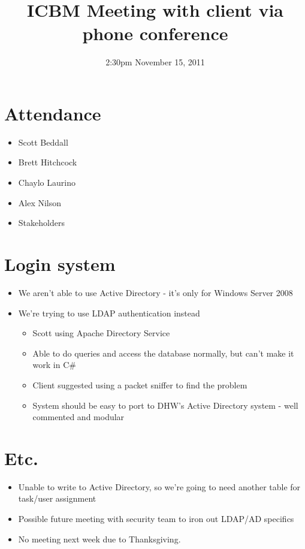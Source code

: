 \documentclass{article}
\begin{document}
\title{ICBM Meeting with client via phone conference}
\date{2:30pm November 15, 2011}
\maketitle

\section{Attendance}
\begin{itemize}
\item Scott Beddall
\item Brett Hitchcock
\item Chaylo Laurino
\item Alex Nilson
\item Stakeholders
\end{itemize}

\section{Login system}
\begin{itemize}
\item We aren't able to use Active Directory - it's only for Windows Server 2008
\item We're trying to use LDAP authentication instead
	\begin{itemize}
	\item Scott using Apache Directory Service
	\item Able to do queries and access the database normally, but can't make it work in C\#
	\item Client suggested using a packet sniffer to find the problem
	\item System should be easy to port to DHW's Active Directory system - well commented and modular
	\end{itemize}
\end{itemize}

\section{Etc.}
\begin{itemize}
\item Unable to write to Active Directory, so we're going to need another table for task/user assignment
\item Possible future meeting with security team to iron out LDAP/AD specifics
\item No meeting next week due to Thanksgiving.
\end{itemize}
\end{document}
